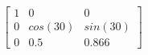 \documentclass[preview]{standalone}
\begin{document}
\begin{align*}
\left[ \begin{array}{ccc}1 & 0 & 0 \\ 0 & cos(30) & sin(30) \\ 0 & 0.5 & 0.866\end{array} \right]
\end{align*}
\end{document}
